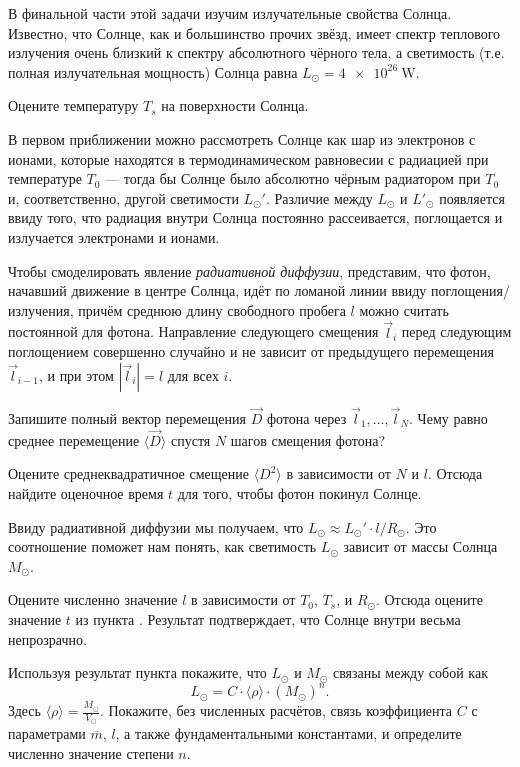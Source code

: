 В финальной части этой задачи изучим излучательные свойства Солнца. Известно, что Солнце, как и большинство прочих звёзд, имеет спектр теплового излучения очень близкий к спектру абсолютного чёрного тела, а светимость (т.е. полная излучательная мощность) Солнца равна $L_\odot=\qty{4e26}{\W}$.
\begin{task}
    \item Оцените температуру $T_s$ на поверхности Солнца.
\end{task}


В первом приближении можно рассмотреть Солнце как шар из электронов с ионами, которые находятся в термодинамическом равновесии с радиацией при температуре $T_0$ --- тогда бы Солнце было абсолютно чёрным радиатором при $T_0$ и, соответственно, другой светимости $L_\odot'$. Различие между $L_\odot$ и $L'_\odot$ появляется ввиду того, что радиация внутри Солнца постоянно рассеивается, поглощается и излучается электронами и ионами.

Чтобы смоделировать явление \textit{радиативной диффузии}, представим, что фотон, начавший движение в центре Солнца, идёт по ломаной линии ввиду поглощения/излучения, причём среднюю длину свободного пробега $l$ можно считать постоянной для фотона. Направление следующего смещения $\vec l_i$ перед следующим поглощением совершенно случайно и не зависит от предыдущего перемещения $\vec l_{i-1}$, и при этом $|\vec l_i|=l$ для всех $i$.

\begin{task}
    \item Запишите полный вектор перемещения $\vec D$ фотона через $\vec l_1,\dots,\vec l_N$. Чему равно среднее перемещение $\langle\vec D\rangle$ спустя $N$ шагов смещения фотона?
    \item Оцените среднеквадратичное смещение $\langle D^2\rangle$ в зависимости от $N$ и $l$. Отсюда найдите оценочное время $t$ для того, чтобы фотон покинул Солнце.
\end{task}

Ввиду радиативной диффузии мы получаем, что $L_\odot \approx L_\odot'\cdot l/R_\odot$. Это соотношение поможет нам понять, как светимость $L_\odot$ зависит от массы Солнца $M_\odot$.

\begin{task}
    \item Оцените численно значение $l$ в зависимости от $T_0$, $T_s$, и $R_\odot$. Отсюда оцените значение $t$ из пункта . Результат подтверждает, что Солнце внутри весьма непрозрачно.
    \item Используя результат пункта  покажите, что $L_\odot$ и $M_\odot$ связаны между собой как
    $$
    L_\odot = C\cdot\langle\rho\rangle\cdot(M_\odot)^n.
    $$
    Здесь $\langle\rho\rangle=\frac{M_\odot}{V_\odot}$. Покажите, без численных расчётов, связь коэффициента $C$ с параметрами $\overline m$, $l$, а также фундаментальными константами, и определите численно значение степени $n$.
\end{task}

